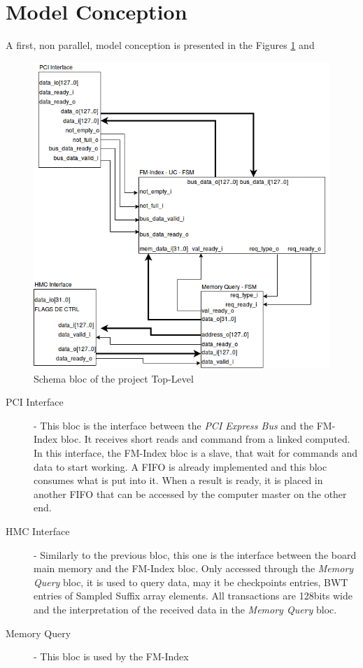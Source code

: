 \section{Model Conception}

A first, non parallel, model conception is presented in the Figures \ref{fig:seqschema} and \\
\begin{figure}[H]
    \centering
    \includegraphics[scale = 0.5]{Figures/schema_bloc.png}
    \caption{Schema bloc of the project Top-Level}
    \label{fig:seqschema}
\end{figure}

\begin{description}
\item [PCI Interface] - This bloc is the interface between the \textsl{PCI Express Bus} and the FM-Index bloc. It receives short reads and command from a linked computed. In this interface, the FM-Index bloc is a slave, that wait for commands and data to start working. A FIFO is already implemented and this bloc consumes what is put into it. When a result is ready, it is placed in another FIFO that can be accessed by the computer master on the other end.
\item [HMC Interface] - Similarly to the previous bloc, this one is the interface between the board main memory and the FM-Index bloc. Only accessed through the \textsl{Memory Query} bloc, it is used to query data, may it be checkpoints entries, BWT entries of Sampled Suffix array elements. All transactions are 128bits wide and the interpretation of the received data in the \textsl{Memory Query} bloc.
\item [Memory Query] - This bloc is used by the FM-Index 
\end{description}


